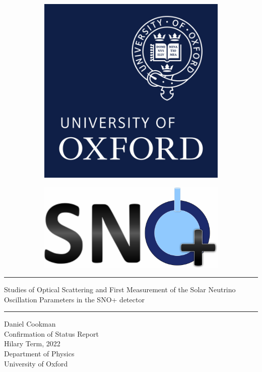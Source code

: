\begin{center}

	\begin{figure}[h!]
        \begin{subfigure}[h!]{0.49\linewidth}
		    \includegraphics[scale=0.3,left]{images/ox_brand_cmyk_pos.png}
        \end{subfigure}
        \begin{subfigure}[h!]{0.5\linewidth}
            \includegraphics[scale=0.3,right]{images/snoplus_logo_big.pdf}
        \end{subfigure}
	\end{figure}

	\vfill

	\hrule
	\vspace{1cm}
	\Huge {Studies of Optical Scattering and First Measurement of the Solar Neutrino Oscillation Parameters in the SNO+ detector}\\
	\vspace{1cm}
	\hrule

	\vfill


	\Large Daniel Cookman\\
	\large Confirmation of Status Report\\
    \large Hilary Term, 2022\\
	\large Department of Physics\\
    \large University of Oxford\\

	\vfill

\end{center}

